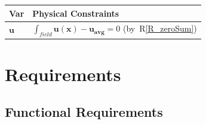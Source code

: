 \documentclass[12pt]{article}
\newcommand{\rref}[1]{R\ref{#1}}
\begin{document}
\begin{table}[!h]
\caption{Output Variables} \label{TblOutputVar}
\renewcommand{\arraystretch}{1.2}
\noindent \begin{longtable*}{l l} 
  \toprule
  \textbf{Var} & \textbf{Physical Constraints} \\
  \midrule 
  $\textbf{u}$ & $\int_{field}\mathbf{u}(\mathbf{x})-\mathbf{u_\text{avg}} = 0$ (by~\rref{R_zeroSum})
  \\
  \bottomrule
\end{longtable*}
\end{table}


\section{Requirements} \label{Sec_req}



\subsection{Functional Requirements}
\end{document}
